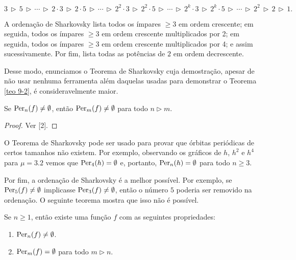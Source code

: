 \begin{definition}
$$3 \, \triangleright \, 5 
\, \triangleright \, \cdots \, \triangleright \,
2 \cdot 3 \, \triangleright \, 2 \cdot 5 
\, \triangleright \, \cdots \, \triangleright \,
2^2 \cdot 3 \, \triangleright \, 2^2 \cdot 5
\, \triangleright \, \cdots \, \triangleright \,
2^k \cdot 3 \, \triangleright \, 2^k \cdot 5
\, \triangleright \, \cdots \, \triangleright \,
2^2 \, \triangleright \, 2 \, \triangleright \, 1.$$
\end{definition}

A ordenação de Sharkovsky lista todos os ímpares $\geq 3$ em ordem crescente; em seguida, todos os ímpares $\geq 3$ em ordem crescente multiplicados por 2; em seguida, todos os ímpares $\geq 3$ em ordem crescente multiplicados por 4; e assim sucessivamente. Por fim, lista todas as potências de $2$ em ordem decrescente.

Desse modo, enunciamos o Teorema de Sharkovsky cuja demostração, apesar de não usar nenhuma ferramenta além daquelas usadas para demonstrar o Teorema \ref{teo 9-2}, é consideravelmente maior.

\begin{theorem}[Sharkovsky]
Se $\operatorname{Per}_n(f) \neq \emptyset$, então $\operatorname{Per}_m(f) \neq \emptyset$ para todo $n \triangleright m$.
\end{theorem}

\begin{proof}
Ver [2].
\end{proof}

O Teorema de Sharkovsky pode ser usado para provar que órbitas periódicas de certos tamanhos não existem. Por exemplo, observando os gráficos de $h$, $h^2$ e $h^4$ para $\mu = 3.2$ vemos que $\operatorname{Per}_4(h) = \emptyset$ e, portanto, $\operatorname{Per}_n(h) = \emptyset$ para todo $n \geq 3$.

Por fim, a ordenação de Sharkovsky é a melhor possível. Por exemplo, se $\operatorname{Per}_5(f) \neq \emptyset$ implicasse $\operatorname{Per}_3(f) \neq \emptyset$, então o número $5$ poderia ser removido na ordenação. O seguinte teorema mostra que isso não é possível.

\begin{theorem}
Se $n \geq 1$, então existe uma função $f$ com as seguintes propriedades:
\begin{enumerate}
\item $\operatorname{Per}_n(f) \neq \emptyset$.
\item $\operatorname{Per}_m(f) =  \emptyset$ para todo $m \triangleright n$.
\end{enumerate}
\end{theorem}

